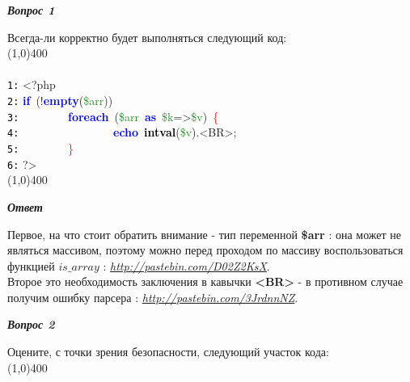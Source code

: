 \documentclass[a4paper,12pt]{article}
\begin{document}
\begin{center}
\textbf{\textit{Вопрос 1}}
\end{center}
Всегда-ли корректно будет выполняться следующий код:\\
\line(1,0){400}
\\
\\
\noindent
\mbox{}\texttt{\textcolor{Black}{1:}} \textcolor{BrickRed}{\textless{}?php} \\
\mbox{}\texttt{\textcolor{Black}{2:}} \textbf{\textcolor{Blue}{if}}\ \textcolor{BrickRed}{(!}\textbf{\textcolor{Blue}{empty}}\textcolor{BrickRed}{(}\textcolor{ForestGreen}{\$arr}\textcolor{BrickRed}{))} \\
\mbox{}\texttt{\textcolor{Black}{3:}} \ \ \ \ \ \ \ \ \textbf{\textcolor{Blue}{foreach}}\ \textcolor{BrickRed}{(}\textcolor{ForestGreen}{\$arr}\ \textbf{\textcolor{Blue}{as}}\ \textcolor{ForestGreen}{\$k}\textcolor{BrickRed}{=\textgreater{}}\textcolor{ForestGreen}{\$v}\textcolor{BrickRed}{)}\ \textcolor{Red}{\{} \\
\mbox{}\texttt{\textcolor{Black}{4:}} \ \ \ \ \ \ \ \ \ \ \ \ \ \ \ \ \textbf{\textcolor{Blue}{echo}}\ \textbf{\textcolor{Black}{intval}}\textcolor{BrickRed}{(}\textcolor{ForestGreen}{\$v}\textcolor{BrickRed}{).\textless{}}BR\textcolor{BrickRed}{\textgreater{};} \\
\mbox{}\texttt{\textcolor{Black}{5:}} \ \ \ \ \ \ \ \ \textcolor{Red}{\}} \\
\mbox{}\texttt{\textcolor{Black}{6:}} \textcolor{BrickRed}{?\textgreater{}} \\
\line(1,0){400} 
\begin{center}
\textit{\textbf{Ответ}}
\end{center}
Первое, на что стоит обратить внимание -  тип переменной \textbf{\$arr} : она может не являться массивом, поэтому можно перед проходом по массиву воспользоваться функцией $is\_array$ : \href{http://pastebin.com/D02Z2KsX}{\textit{http://pastebin.com/D02Z2KsX}}.\\
Второе это необходимость заключения в кавычки \textbf{<BR>} - в противном случае получим ошибку парсера : \href{http://pastebin.com/3JrdnnNZ}{\textit{http://pastebin.com/3JrdnnNZ}}.
\medskip
\begin{center}
\textbf{\textit{Вопрос 2}}
\end{center}
Оцените, с точки зрения безопасности, следующий участок кода:\\
\line(1,0){400}
\\
\\
\noindent
\end{document}

